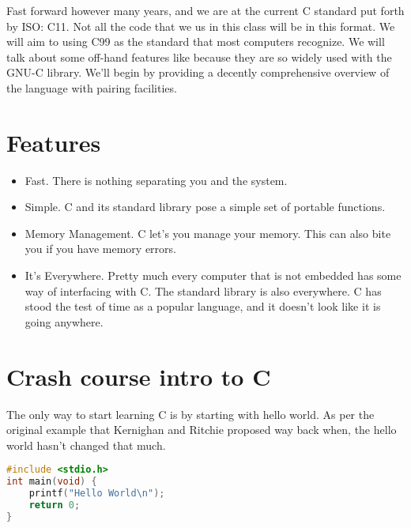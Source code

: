 Fast forward however many years, and we are at the current C standard put forth by ISO: C11. Not all the code that we us in this class will be in this format. We will aim to using C99 as the standard that most computers recognize. We will talk about some off-hand features like  because they are so widely used with the GNU-C library. We'll begin by providing a decently comprehensive overview of the language with pairing facilities.

\section{Features}

\begin{itemize}
\item Fast. There is nothing separating you and the system.
\item Simple. C and its standard library pose a simple set of portable functions.
\item Memory Management. C let's you manage your memory. This can also bite you if you have memory errors.
\item It's Everywhere. Pretty much every computer that is not embedded has some way of interfacing with C. The standard library is also everywhere. C has stood the test of time as a popular language, and it doesn't look like it is going anywhere.
\end{itemize}

\section{Crash course intro to C}

The only way to start learning C is by starting with hello world. As per the original example that Kernighan and Ritchie proposed way back when, the hello world hasn't changed that much.

\begin{lstlisting}[language=C]
#include <stdio.h>
int main(void) { 
    printf("Hello World\n");
    return 0; 
}
\end{lstlisting}

